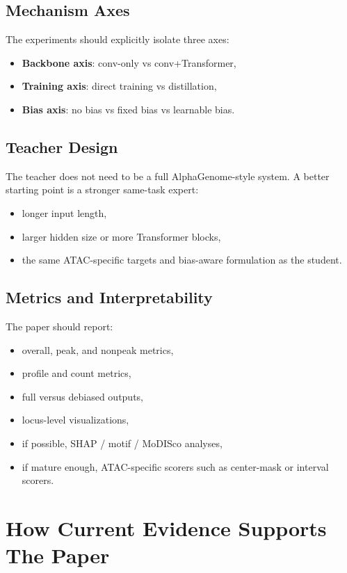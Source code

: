 \documentclass[11pt]{article}
\begin{document}
\subsection{Mechanism Axes}
The experiments should explicitly isolate three axes:
\begin{itemize}[leftmargin=2em]
  \item \textbf{Backbone axis}: conv-only vs conv+Transformer,
  \item \textbf{Training axis}: direct training vs distillation,
  \item \textbf{Bias axis}: no bias vs fixed bias vs learnable bias.
\end{itemize}

\subsection{Teacher Design}
The teacher does not need to be a full AlphaGenome-style system. A better
starting point is a stronger same-task expert:
\begin{itemize}[leftmargin=2em]
  \item longer input length,
  \item larger hidden size or more Transformer blocks,
  \item the same ATAC-specific targets and bias-aware formulation as the student.
\end{itemize}

\subsection{Metrics and Interpretability}
The paper should report:
\begin{itemize}[leftmargin=2em]
  \item overall, peak, and nonpeak metrics,
  \item profile and count metrics,
  \item full versus debiased outputs,
  \item locus-level visualizations,
  \item if possible, SHAP / motif / MoDISco analyses,
  \item if mature enough, ATAC-specific scorers such as center-mask or interval
  scorers.
\end{itemize}

\section{How Current Evidence Supports The Paper}
\end{document}
